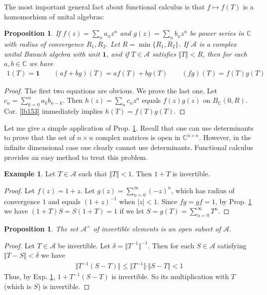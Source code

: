\documentclass[12pt,b5paper,notitlepage]{article}
\theoremstyle{definition}
\newtheorem{eg}[df]{Example}
\theoremstyle{plain}
\newtheorem{pp}[df]{Proposition}
\newcommand{\idt}{\mathbf{1}}
\newcommand{\scr}{\mathscr}
\newcommand{\Cbb}{\mathbb C}
\numberwithin{equation}{section}
\begin{document}
The most important general fact about functional calculus is that $f\mapsto f(T)$ is a homomorhism of unital algebras:

\begin{pp}\label{lb573}
If $f(z)=\sum_n a_nz^n$ and $g(z)=\sum_n b_nz^n$ be power series in $\Cbb$ with radius of convergence $R_1,R_2$. Let $R=\min\{R_1,R_2\}$. If $\scr A$ is a complex unital Banach algebra with unit $\idt$, and if $T\in\scr A$ satisfies $\Vert T\Vert<R$, then for each $a,b\in\Cbb$ we have
\begin{align*}
1(T)=\idt\qquad (af+bg)(T)=af(T)+bg(T)\qquad   (fg)(T)=f(T)g(T)
\end{align*}
\end{pp}


\begin{proof}
The first two equations are obvious. We prove the last one. Let $c_n=\sum_{k=0}^n a_kb_{n-k}$. Then $h(z)=\sum_n c_nz^n$ equals $f(z)g(z)$ on $B_\Cbb(0,R)$. Cor. \ref{lb153} immediately implies $h(T)=f(T)g(T)$.
\end{proof}

Let me give a simple application of Prop. \ref{lb573}. Recall that one can use determinants to prove that the set of $n\times n$ complex matrices is open in $\Cbb^{n\times n}$. However, in the infinite dimensional case one clearly cannot use determinants. Functional calculus provides an easy method to treat this problem.

\begin{eg}\label{lb542}
Let $T\in\scr A$ such that $\Vert T\Vert<1$. Then $1+T$ is invertible.
\end{eg}

\begin{proof}
Let $f(z)=1+z$. Let $g(z)=\sum_{n=0}^\infty (-z)^n$, which has radius of convergence $1$ and equals $(1+z)^{-1}$ when $|z|<1$. Since $fg=gf=1$, by Prop. \ref{lb573} we have $(1+T)S=S(1+T)=1$ if we let $S=g(T)=\sum_{n=0}^\infty T^n$.
\end{proof}


\begin{pp}
The set $\scr A^\times$ of invertible elements is an open subset of $\scr A$.
\end{pp}

\begin{proof}
Let $T\in\scr A$ be invertible. Let $\delta=\Vert T^{-1}\Vert^{-1}$. Then for each $S\in\scr A$ satisfying $\Vert T-S\Vert<\delta$ we have
\begin{align*}
\Vert T^{-1}(S-T)\Vert\leq \Vert T^{-1}\Vert\cdot \Vert S-T\Vert <1
\end{align*}
Thus, by Exp. \ref{lb542}, $1+T^{-1}(S-T)$ is invertible. So its multiplication with $T$ (which is $S$) is invertible.
\end{proof}
\end{document}
